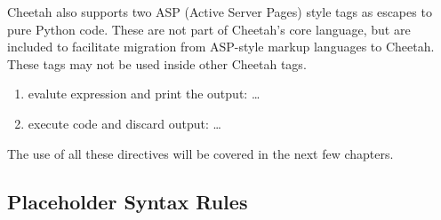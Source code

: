 Cheetah also supports two ASP (Active Server Pages) style tags as escapes to
pure Python code. These are not part of Cheetah's core language, but are
included to facilitate migration from ASP-style markup languages to Cheetah.
These tags may not be used inside other Cheetah tags.
\begin{enumerate}
\item evalute expression and print the output: \code{<\%=} \ldots \code{\%>} 
\item execute code and discard output: \code{<\%} \ldots \code{\%>}
\end{enumerate}

The use of all these directives will be covered in the next few chapters.



\subsection{Placeholder Syntax Rules}
\label{language.placeholdersRules}


